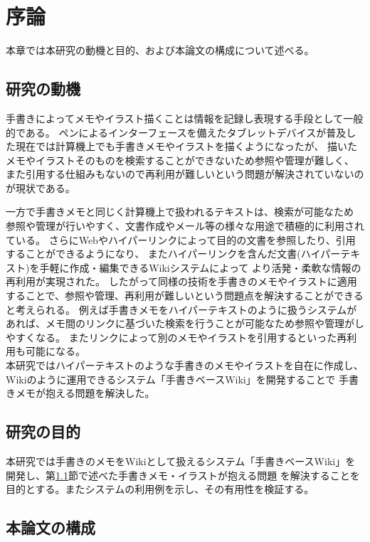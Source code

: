 \chapter{序論}
\label{chap:introduction}

本章では本研究の動機と目的、および本論文の構成について述べる。

\newpage

\section{研究の動機}
\label{douki}

手書きによってメモやイラスト描くことは情報を記録し表現する手段として一般的である。
ペンによるインターフェースを備えたタブレットデバイスが普及した現在では計算機上でも手書きメモやイラストを描くようになったが、
描いたメモやイラストそのものを検索することができないため参照や管理が難しく、
また引用する仕組みもないので再利用が難しいという問題が解決されていないのが現状である。

一方で手書きメモと同じく計算機上で扱われるテキストは、検索が可能なため
参照や管理が行いやすく、文書作成やメール等の様々な用途で積極的に利用されている。
さらにWebやハイパーリンクによって目的の文書を参照したり、引用することができるようになり、
またハイパーリンクを含んだ文書(ハイパーテキスト)を手軽に作成・編集できるWikiシステムによって
より活発・柔軟な情報の再利用が実現された。
したがって同様の技術を手書きのメモやイラストに適用することで、参照や管理、再利用が難しいという問題点を解決することができると考えられる。
例えば手書きメモをハイパーテキストのように扱うシステムがあれば、メモ間のリンクに基づいた検索を行うことが可能なため参照や管理がしやすくなる。
またリンクによって別のメモやイラストを引用するといった再利用も可能になる。
\\
本研究ではハイパーテキストのような手書きのメモやイラストを自在に作成し、Wikiのように運用できるシステム「手書きベースWiki」を開発することで
手書きメモが抱える問題を解決した。

\section{研究の目的}
本研究では手書きのメモをWikiとして扱えるシステム「手書きベースWiki」を開発し、第\ref{douki}節で述べた手書きメモ・イラストが抱える問題
を解決することを目的とする。またシステムの利用例を示し、その有用性を検証する。

\newpage

\section{本論文の構成}

